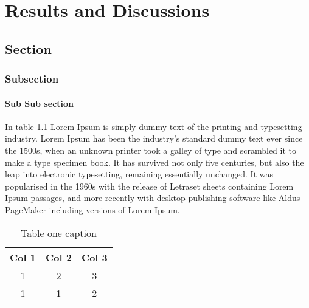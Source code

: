 \chapter{Results and Discussions}

\section{Section}

\subsection{Subsection}
\subsubsection{Sub Sub section}

In table \ref{table_1} Lorem Ipsum is simply dummy text of the printing and typesetting industry. Lorem Ipsum has been the industry's standard dummy text ever since the 1500s, when an unknown printer took a galley of type and scrambled it to make a type specimen book. It has survived not only five centuries, but also the leap into electronic typesetting, remaining essentially unchanged. It was popularised in the 1960s with the release of Letraset sheets containing Lorem Ipsum passages, and more recently with desktop publishing software like Aldus PageMaker including versions of Lorem Ipsum.


\begin{table}[]
\begin{tabular}{|c|c|c|}
\hline
\textbf{Col 1}            & \textbf{Col 2} & \textbf{Col 3}            \\ \hline
\cellcolor[HTML]{C0C0C0}1 & 2              & \cellcolor[HTML]{FD6864}3 \\ \hline
1                         & 1              & 2                         \\ \hline
\end{tabular}
\caption{Table one caption}
\label{table_1}
\end{table}

